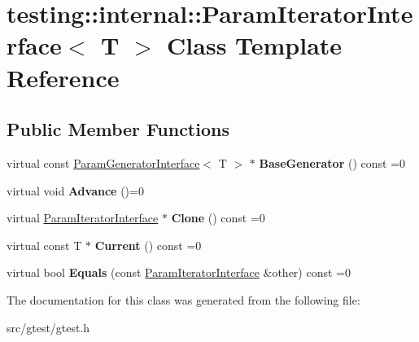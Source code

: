 \hypertarget{classtesting_1_1internal_1_1_param_iterator_interface}{}\section{testing\+:\+:internal\+:\+:Param\+Iterator\+Interface$<$ T $>$ Class Template Reference}
\label{classtesting_1_1internal_1_1_param_iterator_interface}
\subsection*{Public Member Functions}
\begin{DoxyCompactItemize}
\item 
\mbox{\label{classtesting_1_1internal_1_1_param_iterator_interface_a17500953df75ecda1ace46c08ff731e9}} 
virtual const \mbox{\hyperlink{classtesting_1_1internal_1_1_param_generator_interface}{Param\+Generator\+Interface}}$<$ T $>$ $\ast$ {\bfseries Base\+Generator} () const =0
\item 
\mbox{\label{classtesting_1_1internal_1_1_param_iterator_interface_a600dbd35fcb551463e379516a1abea48}} 
virtual void {\bfseries Advance} ()=0
\item 
\mbox{\label{classtesting_1_1internal_1_1_param_iterator_interface_a4998c23e27e2943d97546011aa35db80}} 
virtual \mbox{\hyperlink{classtesting_1_1internal_1_1_param_iterator_interface}{Param\+Iterator\+Interface}} $\ast$ {\bfseries Clone} () const =0
\item 
\mbox{\label{classtesting_1_1internal_1_1_param_iterator_interface_adfff808576d929085679c315b255af7e}} 
virtual const T $\ast$ {\bfseries Current} () const =0
\item 
\mbox{\label{classtesting_1_1internal_1_1_param_iterator_interface_a9d811697a752d46f7bd6a0082f9040a3}} 
virtual bool {\bfseries Equals} (const \mbox{\hyperlink{classtesting_1_1internal_1_1_param_iterator_interface}{Param\+Iterator\+Interface}} \&other) const =0
\end{DoxyCompactItemize}


The documentation for this class was generated from the following file\+:\begin{DoxyCompactItemize}
\item 
src/gtest/gtest.\+h\end{DoxyCompactItemize}
